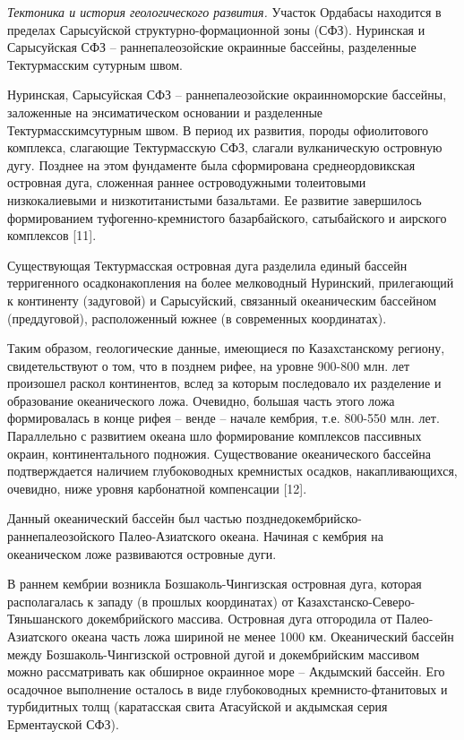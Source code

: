 \begin{multicols}{2}
\emph{Тектоника и история геологического развития.} Участок Ордабасы
находится в пределах Сарысуйской структурно-формационной зоны (СФЗ).
Нуринская и Сарысуйская СФЗ -- раннепалеозойские окраинные бассейны,
разделенные Тектурмасским сутурным швом.

Нуринская, Сарысуйская СФЗ -- раннепалеозойские окраинноморские
бассейны, заложенные на энсиматическом основании и разделенные
Тектурмасскимсутурным швом. В период их развития, породы офиолитового
комплекса, слагающие Тектурмасскую СФЗ, слагали вулканическую островную
дугу. Позднее на этом фундаменте была сформирована среднеордовикская
островная дуга, сложенная раннее островодужными толеитовыми
низкокалиевыми и низкотитанистыми базальтами. Ее развитие завершилось
формированием туфогенно-кремнистого базарбайского, сатыбайского и
аирского комплексов {[}11{]}.

Существующая Тектурмасская островная дуга разделила единый бассейн
терригенного осадконакопления на более мелководный Нуринский,
прилегающий к континенту (задуговой) и Сарысуйский, связанный
океаническим бассейном (преддуговой), расположенный южнее (в современных
координатах).

Таким образом, геологические данные, имеющиеся по Казахстанскому
региону, свидетельствуют о том, что в позднем рифее, на уровне 900-800
млн. лет произошел раскол континентов, вслед за которым последовало их
разделение и образование океанического ложа. Очевидно, большая часть
этого ложа формировалась в конце рифея -- венде -- начале кембрия, т.е.
800-550 млн. лет. Параллельно с развитием океана шло формирование
комплексов пассивных окраин, континентального подножия. Существование
океанического бассейна подтверждается наличием глубоководных кремнистых
осадков, накапливающихся, очевидно, ниже уровня карбонатной компенсации
{[}12{]}.

Данный океанический бассейн был частью позднедокембрийско-
раннепалеозойского Палео-Азиатского океана. Начиная с кембрия на
океаническом ложе развиваются островные дуги.

В раннем кембрии возникла Бозшаколь-Чингизская островная дуга, которая
располагалась к западу (в прошлых координатах) от
Казахстанско-Северо-Тяньшанского докембрийского массива. Островная дуга
отгородила от Палео-Азиатского океана часть ложа шириной не менее 1000
км. Океанический бассейн между Бозшаколь-Чингизской островной дугой и
докембрийским массивом можно рассматривать как обширное окраинное море
-- Акдымский бассейн. Его осадочное выполнение осталось в виде
глубоководных кремнисто-фтанитовых и турбидитных толщ (каратасская свита
Атасуйской и акдымская серия Ерментауской СФЗ).


\end{multicols}
